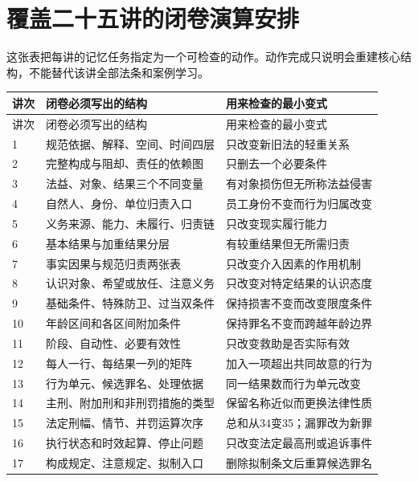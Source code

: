 
\section{覆盖二十五讲的闭卷演算安排}
这张表把每讲的记忆任务指定为一个可检查的动作。动作完成只说明会重建核心结构，不能替代该讲全部法条和案例学习。

\begingroup\small\linespread{1}\selectfont
\setlength{\LTpre}{4pt}\setlength{\LTpost}{4pt}
\begin{longtable}{p{}p{}p{}}
\toprule
讲次 & 闭卷必须写出的结构 & 用来检查的最小变式\\\midrule
\endfirsthead
\toprule 讲次 & 闭卷必须写出的结构 & 用来检查的最小变式\\\midrule\endhead
1 & 规范依据、解释、空间、时间四层 & 只改变新旧法的轻重关系\\
2 & 完整构成与阻却、责任的依赖图 & 只删去一个必要条件\\
3 & 法益、对象、结果三个不同变量 & 有对象损伤但无所称法益侵害\\
4 & 自然人、身份、单位归责入口 & 员工身份不变而行为归属改变\\
5 & 义务来源、能力、未履行、归责链 & 只改变现实履行能力\\
6 & 基本结果与加重结果分层 & 有较重结果但无所需归责\\
7 & 事实因果与规范归责两张表 & 只改变介入因素的作用机制\\
8 & 认识对象、希望或放任、注意义务 & 只改变对特定结果的认识态度\\
9 & 基础条件、特殊防卫、过当双条件 & 保持损害不变而改变限度条件\\
10 & 年龄区间和各区间附加条件 & 保持罪名不变而跨越年龄边界\\
11 & 阶段、自动性、必要有效性 & 只改变救助是否实际有效\\
12 & 每人一行、每结果一列的矩阵 & 加入一项超出共同故意的行为\\
13 & 行为单元、候选罪名、处理依据 & 同一结果数而行为单元改变\\
14 & 主刑、附加刑和非刑罚措施的类型 & 保留名称近似而更换法律性质\\
15 & 法定刑幅、情节、并罚运算次序 & 总和从34变35；漏罪改为新罪\\
16 & 执行状态和时效起算、停止问题 & 只改变法定最高刑或追诉事件\\
17 & 构成规定、注意规定、拟制入口 & 删除拟制条文后重算候选罪名\\

\end{longtable}
